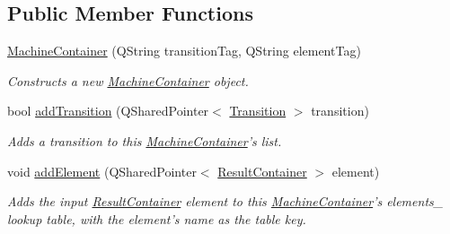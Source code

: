 \subsection*{Public Member Functions}
\begin{DoxyCompactItemize}
\item 
\hyperlink{class_picto_1_1_machine_container_ad038f9042442d026b1a48f58c0ebfedc}{Machine\-Container} (Q\-String transition\-Tag, Q\-String element\-Tag)
\begin{DoxyCompactList}\small\item\em Constructs a new \hyperlink{class_picto_1_1_machine_container}{Machine\-Container} object. \end{DoxyCompactList}\item 
\hypertarget{class_picto_1_1_machine_container_a6269dc1f507e14af1d27c91a6c04cfc9}{bool \hyperlink{class_picto_1_1_machine_container_a6269dc1f507e14af1d27c91a6c04cfc9}{add\-Transition} (Q\-Shared\-Pointer$<$ \hyperlink{class_picto_1_1_transition}{Transition} $>$ transition)}\label{class_picto_1_1_machine_container_a6269dc1f507e14af1d27c91a6c04cfc9}

\begin{DoxyCompactList}\small\item\em Adds a transition to this \hyperlink{class_picto_1_1_machine_container}{Machine\-Container}'s list. \end{DoxyCompactList}\item 
\hypertarget{class_picto_1_1_machine_container_a9bd04896f5eb5e55cb144d2d1b780834}{void \hyperlink{class_picto_1_1_machine_container_a9bd04896f5eb5e55cb144d2d1b780834}{add\-Element} (Q\-Shared\-Pointer$<$ \hyperlink{class_picto_1_1_result_container}{Result\-Container} $>$ element)}\label{class_picto_1_1_machine_container_a9bd04896f5eb5e55cb144d2d1b780834}

\begin{DoxyCompactList}\small\item\em Adds the input \hyperlink{class_picto_1_1_result_container}{Result\-Container} element to this \hyperlink{class_picto_1_1_machine_container}{Machine\-Container}'s elements\-\_\- lookup table, with the element's name as the table key. \end{DoxyCompactList}\end{DoxyCompactItemize}
